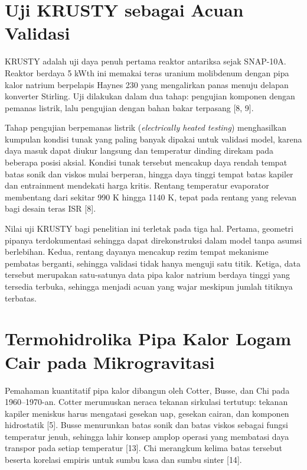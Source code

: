 \documentclass[
  indonesian,
  12pt,
  a4paper,
]{report}
\begin{document}
\section{Uji KRUSTY sebagai Acuan
Validasi}\label{uji-krusty-sebagai-acuan-validasi}

KRUSTY adalah uji daya penuh pertama reaktor antariksa sejak SNAP-10A.
Reaktor berdaya 5 kWth ini memakai teras uranium molibdenum dengan pipa
kalor natrium berpelapis Haynes 230 yang mengalirkan panas menuju
delapan konverter Stirling. Uji dilakukan dalam dua tahap: pengujian
komponen dengan pemanas listrik, lalu pengujian dengan bahan bakar
terpasang {[}8, 9{]}.

Tahap pengujian berpemanas listrik (\emph{electrically heated testing})
menghasilkan kumpulan kondisi tunak yang paling banyak dipakai untuk
validasi model, karena daya masuk dapat diukur langsung dan temperatur
dinding direkam pada beberapa posisi aksial. Kondisi tunak tersebut
mencakup daya rendah tempat batas sonik dan viskos mulai berperan,
hingga daya tinggi tempat batas kapiler dan entrainment mendekati harga
kritis. Rentang temperatur evaporator membentang dari sekitar 990 K
hingga 1140 K, tepat pada rentang yang relevan bagi desain teras ISR
{[}8{]}.

Nilai uji KRUSTY bagi penelitian ini terletak pada tiga hal. Pertama,
geometri pipanya terdokumentasi sehingga dapat direkonstruksi dalam
model tanpa asumsi berlebihan. Kedua, rentang dayanya mencakup rezim
tempat mekanisme pembatas berganti, sehingga validasi tidak hanya
menguji satu titik. Ketiga, data tersebut merupakan satu-satunya data
pipa kalor natrium berdaya tinggi yang tersedia terbuka, sehingga
menjadi acuan yang wajar meskipun jumlah titiknya terbatas.

\section{Termohidrolika Pipa Kalor Logam Cair pada
Mikrogravitasi}\label{termohidrolika-pipa-kalor-logam-cair-pada-mikrogravitasi}

Pemahaman kuantitatif pipa kalor dibangun oleh Cotter, Busse, dan Chi
pada 1960--1970-an. Cotter merumuskan neraca tekanan sirkulasi tertutup:
tekanan kapiler meniskus harus mengatasi gesekan uap, gesekan cairan,
dan komponen hidrostatik {[}5{]}. Busse menurunkan batas sonik dan batas
viskos sebagai fungsi temperatur jenuh, sehingga lahir konsep amplop
operasi yang membatasi daya transpor pada setiap temperatur {[}13{]}.
Chi merangkum kelima batas tersebut beserta korelasi empiris untuk sumbu
kasa dan sumbu sinter {[}14{]}.
\end{document}
